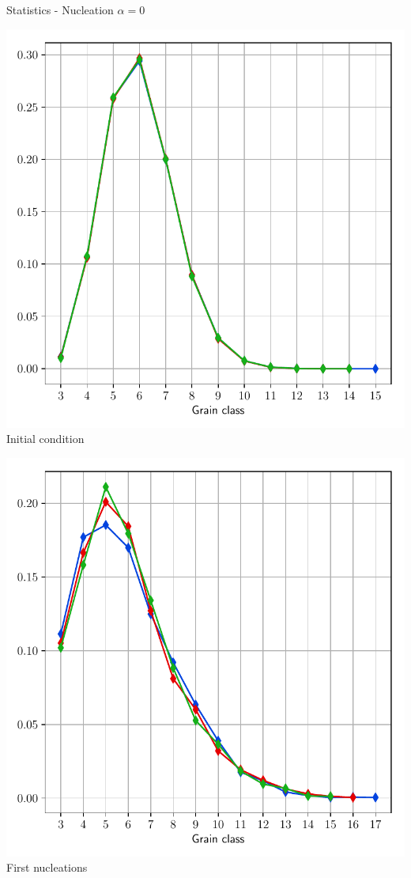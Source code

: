 \documentclass[usenames,dvipsnames]{beamer}
\begin{document}
\begin{frame}{Statistics - Nucleation $\alpha = 0$}
\small
    \begin{minipage}{0.5\textwidth}
    \centering
    \includegraphics[scale=0.35]{figures/stored_energy/SE/nsides/000000_nuclconstant_set.pdf}\\
    Initial condition
    \end{minipage}%
    \begin{minipage}{0.5\textwidth}
    \centering
    \includegraphics[scale=0.35]{figures/stored_energy/SE/nsides/000070_nuclconstant_set.pdf}\\
    First nucleations
    \end{minipage}
\end{frame}
\end{document}
